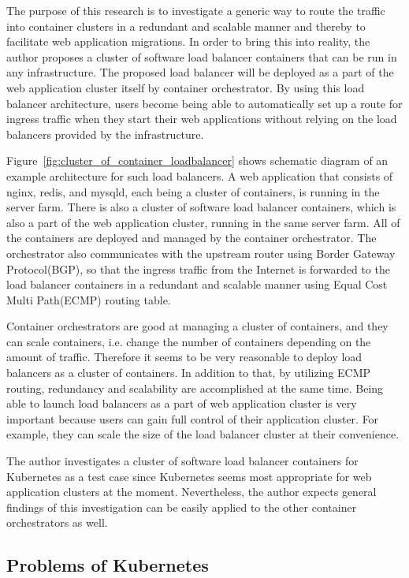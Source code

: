 The purpose of this research is to investigate a generic way to route the traffic into container clusters in a redundant and scalable manner and thereby to facilitate web application migrations.
In order to bring this into reality, the author proposes a cluster of software load balancer containers that can be run in any infrastructure.
The proposed load balancer will be deployed as a part of the web application cluster itself by container orchestrator.
By using this load balancer architecture, users become being able to automatically set up a route for ingress traffic when they start their web applications without relying on the load balancers provided by the infrastructure.

Figure~\ref{fig:cluster_of_container_loadbalancer} shows schematic diagram of an example architecture for such load balancers.
A web application that consists of nginx, redis, and mysqld, each being a cluster of containers, is running in the server farm.
There is also a cluster of software load balancer containers, which is also a part of the web application cluster, running in the same server farm. 
All of the containers are deployed and managed by the container orchestrator.
The orchestrator also communicates with the upstream router using Border Gateway Protocol(BGP), so that the ingress traffic from the Internet is forwarded to the load balancer containers in a redundant and scalable manner using Equal Cost Multi Path(ECMP)\cite{rfc7911} routing table.

Container orchestrators are good at managing a cluster of containers, and they can scale containers, i.e. change the number of containers depending on the amount of traffic.
Therefore it seems to be very reasonable to deploy load balancers as a cluster of containers.
In addition to that, by utilizing ECMP routing, redundancy and scalability are accomplished at the same time.
Being able to launch load balancers as a part of web application cluster is very important because users can gain full control of their application cluster.
For example, they can scale the size of the load balancer cluster at their convenience.

The author investigates a cluster of software load balancer containers for Kubernetes as a test case since Kubernetes seems most appropriate for web application clusters at the moment.
Nevertheless, the author expects general findings of this investigation can be easily applied to the other container orchestrators as well.

\subsection{Problems of Kubernetes}

